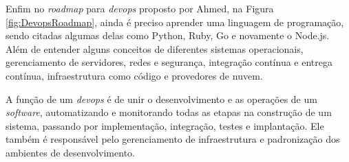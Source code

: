 \documentclass[
	12pt,				%
	openright,			%
	twoside,			%
	a4paper,			%
	english,			%
	brazil				%
	]{abntex2}
\begin{document}
Enfim no \textit{roadmap} para \textit{devops} proposto por Ahmed\cite{ahmedse_roadmap}, na Figura \ref{fig:DevopsRoadmap}, ainda é preciso aprender uma linguagem de programação, sendo citadas algumas delas como Python, Ruby, Go e novamente o Node.js. Além de entender alguns conceitos de diferentes sistemas operacionais, gerenciamento de servidores, redes e segurança, integração contínua e entrega contínua, infraestrutura como código e provedores de nuvem.

A função de um \textit{devops} é de unir o desenvolvimento e as operações de um \textit{software}, automatizando e monitorando todas as etapas na construção de um sistema, passando por implementação, integração, testes e implantação. Ele também é responsável pelo gerenciamento de infraestrutura e padronização dos ambientes de desenvolvimento.
\end{document}
